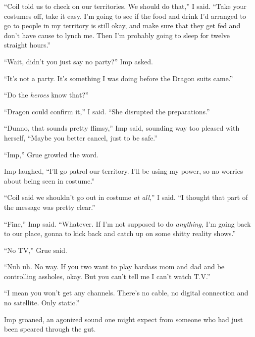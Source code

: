 ``Coil told us to check on our territories.  We should do that,'' I said.  ``Take your costumes off, take it easy.  I'm going to see if the food and drink I'd arranged to go to people in my territory is still okay, and make sure that they get fed and don't have cause to lynch me.  Then I'm probably going to sleep for twelve straight hours.''



``Wait, didn't you just say no party?'' Imp asked.



``It's not a party.  It's something I was doing before the Dragon suits came.''



``Do the \emph{heroes} know that?''



``Dragon could confirm it,'' I said.  ``She disrupted the preparations.''



``Dunno, that sounds pretty flimsy,'' Imp said, sounding way too pleased with herself, ``Maybe you better cancel, just to be safe.''



``Imp,'' Grue growled the word.



Imp laughed, ``I'll go patrol our territory.  I'll be using my power, so no worries about being seen in costume.''



``Coil said we shouldn't go out in costume \emph{at all},'' I said.  ``I thought that part of the message was pretty clear.''



``Fine,'' Imp said.  ``Whatever.  If I'm not supposed to do \emph{anything, }I'm going back to our place, gonna to kick back and catch up on some shitty reality shows.''



``No TV,'' Grue said.



``Nuh uh.  No way.  If you two want to play hardass mom and dad and be controlling assholes, okay.  But you can't tell me I can't watch T.V.''



``I mean you won't get any channels.  There's no cable, no digital connection and no satellite.  Only static.''



Imp groaned, an agonized sound one might expect from someone who had just been speared through the gut.



